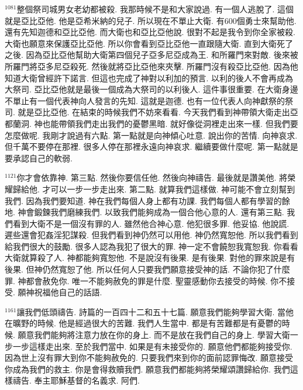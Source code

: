 \documentclass{book}
\begin{document}
$^{1081}$整個祭司城男女老幼都被殺.
我那時候不是和大家說過.
有一個人逃脫了.
這個就是亞比亞他.
他是亞希米納的兒子.
所以現在不單止大衛.
有600個勇士來幫助他.
還有先知迦德和亞比亞他.
而大衛也和亞比亞他說.
很對不起是我令到你全家被殺.
大衛也願意來保護亞比亞他.
所以你會看到亞比亞他一直跟隨大衛.
直到大衛死了之後.
因為亞比亞他幫助大衛第四個兒子亞多尼亞成為王.
和所羅門來對敵.
後來被所羅門將亞多尼亞殺死.
然後就將亞比亞他來夾擊.
所羅門沒有殺亞比亞他.
因為他知道大衛曾經許下諾言.
但這也完成了神對以利加的預言.
以利的後人不會再成為大祭司.
亞比亞他就是最後一個成為大祭司的以利後人.
這件事很重要.
在大衛身邊不單止有一個代表神向人發言的先知.
這就是迦德.
也有一位代表人向神獻祭的祭司.
就是亞比亞他.
在結束的時候我們不妨來看看.
今天我們看到神帶領大衛走出亞都蘭洞.
神也能帶領我們走出我們的憂鬱黑暗.
就好像從洞裡走出來一樣.
但我們要怎麼做呢.
我剛才說過有六點.
第一點就是向神傾心吐意.
說出你的苦情.
向神哀求.
但千萬不要停在那裡.
很多人停在那裡永遠向神哀求.
繼續要做什麼呢.
第一點就是要承認自己的軟弱.

$^{1121}$你才會依靠神.
第三點.
然後你要信任他.
然後向神禱告.
最後就是讚美他.
將榮耀歸給他.
才可以一步一步走出來.
第二點.
就算我們這樣做.
神可能不會立刻幫到我們.
因為我們要知道.
神在我們每個人身上都有功課.
我們每個人都有學習的餘地.
神會鍛鍊我們磨練我們.
以致我們能夠成為一個合他心意的人.
還有第三點.
我們看到大衛不是一個沒有罪的人.
雖然他合神心意.
他犯很多罪.
他妥協.
他說謊.
遲些還會犯姦淫犯謀殺.
但我們看到神仍然可以用他.
神仍然寬恕他.
所以我們看到給我們很大的鼓勵.
很多人認為我犯了很大的罪.
神一定不會饒恕我寬恕我.
你看看大衛就算殺了人.
神都能夠寬恕他.
不是說沒有後果.
是有後果.
對他的罪來說是有後果.
但神仍然寬恕了他.
所以任何人只要我們願意接受神的話.
不論你犯了什麼罪.
神都會赦免你.
唯一不能夠赦免的罪是什麼.
聖靈感動你去接受的時候.
你不接受.
願神祝福他自己的話語.

$^{1161}$讓我們低頭禱告.
詩篇的一百四十二和五十七篇.
願意我們能夠學習大衛.
當他在曠野的時候.
他是經過很大的苦難.
我們人生當中.
都是有苦難都是有憂鬱的時候.
願意我們能夠將注意力放在你的身上.
而不是放在我們自己的身上.
學習大衛一步一步這樣走出來.
至於我們當中.
如果是有未接受你的.
願意他們都能夠接受你.
因為世上沒有罪大到你不能夠赦免的.
只要我們來到你的面前認罪悔改.
願意接受你成為我們的救主.
你是會得救贖我們.
願意我們都能夠將榮耀頌讚歸給你.
我們這樣禱告.
奉主耶穌基督的名義求.
阿們.
\newpage
\end{document}
